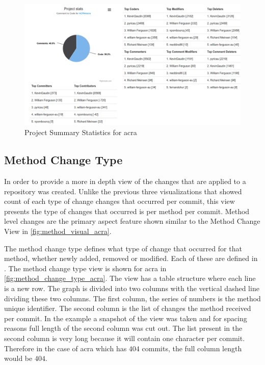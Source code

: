 \begin{landscape}
\thispagestyle{empty}
 \begin{figure}
  \centering
        \includegraphics[width=1.5\textwidth]{images/table_visual}
    \caption{Project Summary Statistics for acra}
    \label{fig:project_summary_stats}
 \end{figure}
\end{landscape}
\pagestyle{plain}

\subsection{Method Change Type}

In order to provide a more in depth view of the changes that are applied to a repository was created. Unlike the previous three visualizations that showed count of each type of change changes that occurred per commit, this view presents the type of changes that occurred is per method per commit. Method level changes are the primary aspect feature shown similar to the Method Change View in \autoref{fig:method_visual_acra}.

The method change type defines what type of change that occurred for that method, whether newly added, removed or modified. Each of these are defined in . The method change type view is shown for acra in \autoref{fig:method_change_type_acra}. The view has a table structure where each line is a new row. The graph is divided into two columns with the vertical dashed line dividing these two columns. The first column, the series of numbers is the method unique identifier. The second column is the list of changes the method received per commit. In the example a snapshot of the view was taken and for spacing reasons full length of the second column was cut out. The list present in the second column is very long because it will contain one character per commit. Therefore in the case of acra which has $404$ commits, the full column length would be $404$.

